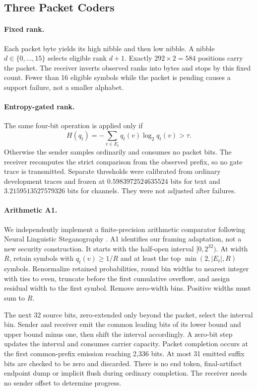 \subsection{Three Packet Coders}
\label{sec:coders}
\paragraph{Fixed rank.}
Each packet byte yields its high nibble and then low nibble. A nibble $d\in\{0,\ldots,15\}$ selects eligible rank $d+1$. Exactly $292\times2=584$ positions carry the packet. The receiver inverts observed ranks into bytes and stops by this fixed count. Fewer than 16 eligible symbols while the packet is pending causes a support failure, not a smaller alphabet.

\paragraph{Entropy-gated rank.}
The same four-bit operation is applied only if
\begin{equation}
H(q_t)=-\sum_{v\in E_t}q_t(v)\log_2q_t(v)>\tau.
\end{equation}
Otherwise the sender samples ordinarily and consumes no packet bits. The receiver recomputes the strict comparison from the observed prefix, so no gate trace is transmitted. Separate thresholds were calibrated from ordinary development traces and frozen at $0.5983972524635524$ bits for text and $3.2159513527579326$ bits for channels. They were not adjusted after failures.

\paragraph{Arithmetic A1.}
We independently implement a finite-precision arithmetic comparator following Neural Linguistic Steganography \cite{ziegler}. A1 identifies our framing adaptation, not a new security construction. It starts with the half-open interval $[0,2^{32})$. At width $R$, retain symbols with $q_t(v)\geq1/R$ and at least the top $\min(2,|E_t|,R)$ symbols. Renormalize retained probabilities, round bin widths to nearest integer with ties to even, truncate before the first cumulative overflow, and assign residual width to the first symbol. Remove zero-width bins. Positive widths must sum to $R$.

The next 32 source bits, zero-extended only beyond the packet, select the interval bin. Sender and receiver emit the common leading bits of its lower bound and upper bound minus one, then shift the interval accordingly. A zero-bit step updates the interval and consumes carrier capacity. Packet completion occurs at the first common-prefix emission reaching 2,336 bits. At most 31 emitted suffix bits are checked to be zero and discarded. There is no end token, final-artifact endpoint dump or implicit flush during ordinary completion. The receiver needs no sender offset to determine progress.

